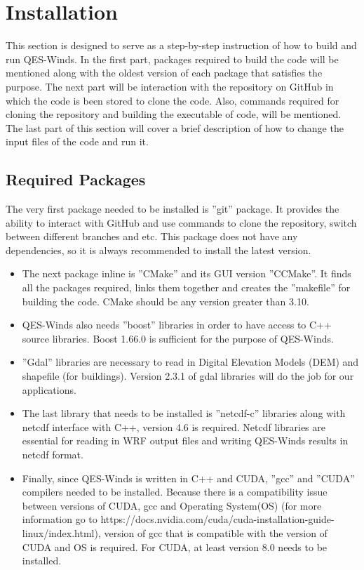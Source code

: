 \section{Installation}

This section is designed to serve as a step-by-step instruction of how to build and run QES-Winds. In the first part, packages required to build the code will be mentioned along with the oldest version of each package that satisfies the purpose. The next part will be interaction with the repository on GitHub in which the code is been stored to clone the code. Also, commands required for cloning the repository and building the executable of code, will be mentioned. The last part of this section will cover a brief description of how to change the input files of the code and run it.

\subsection{Required Packages}

The very first package needed to be installed is ''git'' package. It provides the ability to interact with GitHub and use commands to clone the repository, switch between different branches and etc. This package does not have any dependencies, so it is always recommended to install the latest version.

\begin{itemize}
\item The next package inline is ''CMake'' and its GUI version ''CCMake''. It finds all the packages required, links them together and creates the ''makefile'' for building the code. CMake should be any version greater than 3.10.
\item QES-Winds also needs ''boost'' libraries in order to have access to C++ source libraries. Boost 1.66.0 is sufficient for the purpose of QES-Winds.
\item ''Gdal'' libraries are necessary to read in Digital Elevation Models (DEM) and shapefile (for buildings). Version 2.3.1 of gdal libraries will do the job for our applications.

\item The last library that needs to be installed is ''netcdf-c'' libraries along with netcdf interface with C++, version 4.6 is required. Netcdf libraries are essential for reading in WRF output files and writing QES-Winds results in netcdf format.

\item Finally, since QES-Winds is written in C++ and CUDA, ''gcc'' and ''CUDA'' compilers needed to be installed. Because there is a compatibility issue between versions of CUDA, gcc and Operating System(OS) (for more information go to https://docs.nvidia.com/cuda/cuda-installation-guide-linux/index.html), version of gcc that is compatible with the version of CUDA and OS is required. For CUDA, at least version 8.0 needs to be installed.
\end{itemize}

